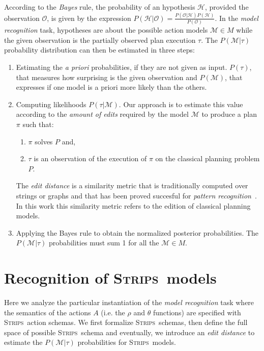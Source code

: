 \documentclass[letterpaper]{article} %
\newcommand{\strips}{\textsc{Strips}}     %
\begin{document}
According to the {\em Bayes} rule, the probability of an hypothesis $\mathcal{H}$, provided the observation $\mathcal{O}$, is given by the expression $P(\mathcal{H}|\mathcal{O})=\frac{P(\mathcal{O}|\mathcal{H})P(\mathcal{H})}{P(\mathcal{O})}$. In the {\em model recognition} task, hypotheses are about the possible action models $\mathcal{M}\in M$ while the given observation is the partially observed plan execution $\tau$. The $P(\mathcal{M}|\tau)$ probability distribution can then be estimated in three steps:
\begin{enumerate}
\item Estimating the {\em a priori} probabilities, if they are not given as input. $P(\tau)$, that measures how surprising is the given observation and $P(\mathcal{M})$, that expresses if one model is a priori more likely than the others. 
\item Computing likelihoods $P(\tau|\mathcal{M})$.  Our approach is to estimate this value according to the {\em amount of edits} required by the model $\mathcal{M}$ to produce a plan $\pi$ such that:
\begin{enumerate}
\item $\pi$ solves $P$ and,
\item $\tau$ is an observation of the execution of $\pi$ on the classical planning problem $P$. 
\end{enumerate}
The {\em edit distance} is a similarity metric that is traditionally computed over strings or graphs and that has been proved succesful for {\em pattern recognition}~\cite{masek1980faster,bunke1997relation}. In this work this similarity metric refers to the edition of classical planning models.
\item Applying the Bayes rule to obtain the normalized posterior probabilities. The $P(\mathcal{M}|\tau)$ probabilities must sum 1 for all the $\mathcal{M}\in M$.
\end{enumerate}



\section{Recognition of \strips\ models}
\label{sec:asPlanning}
Here we analyze the particular instantiation of the {\em model recognition} task where the semantics of the actions $A$ (i.e. the $\rho$ and $\theta$ functions) are specified with \strips\ action schemas. We first formalize \strips\ schemas, then define the full space of possible \strips\ schema and eventually, we introduce an {\em edit distance} to estimate the $P(\mathcal{M}|\tau)$ probabilities for \strips\ models.
\end{document}
